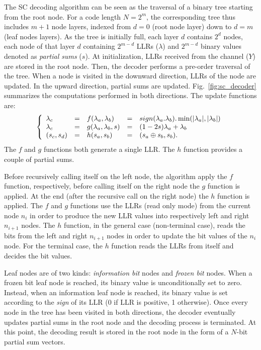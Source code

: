 The SC decoding algorithm can be seen as the traversal of a binary tree starting
from the root node. For a code length $N=2^m$, the corresponding tree thus
includes $m + 1$ node layers, indexed from $d=0$ (root node layer) down to
$d=m$ (leaf nodes layers). As the tree is initially full, each layer $d$
contains $2^d$ nodes, each node of that layer $d$  containing $2^{m-d}$ LLRs
($\lambda$) and $2^{m-d}$ binary values denoted as \textit{partial sums} ($s$).
At initialization, LLRs received  from the channel ($Y$) are stored in the root
node. Then, the decoder performs a pre-order traversal of the tree. When a node
is visited in the downward direction, LLRs of the node are updated. In the
upward direction, partial sums are updated. Fig.~\ref{fig:sc_decoder} summarizes
the computations performed in both directions. The update functions are:
\begin{eqnarray}
\left\{\begin{array}{l c l c l}
\lambda_c &=& f(\lambda_a,\lambda_b) &=& sign(\lambda_a.\lambda_b).\min(|\lambda_a|,|\lambda_b|)\\
\lambda_c &=& g(\lambda_a,\lambda_b,s)&=&(1-2s)\lambda_a+\lambda_b\\
(s_{c}, s_{d}) &=& h(s_{a}, s_{b}) &=& (s_{a} \oplus s_{b}, s_{b}).
\end{array}\right.
\label{eq:f_g}
\end{eqnarray}
The $f$ and $g$ functions both generate a single LLR. The $h$ function provides
a couple of partial sums.

Before recursively calling itself on the left node, the algorithm apply the $f$
function, respectively, before calling itself on the right node the $g$ function
is applied. At the end (after the recursive call on the right node) the $h$
function is applied. The $f$ and $g$ functions use the LLRs (read only mode)
from the current node $n_i$ in order to produce the new LLR values into
respectively left and right $n_{i+1}$ nodes. The $h$ function, in the general
case (non-terminal case), reads the bits from the left and right $n_{i+1}$ nodes
in order to update the bit values of the $n_i$ node. For the terminal case, the
$h$ function reads the LLRs from itself and decides the bit values.

Leaf nodes are of two kinds: \emph{information bit} nodes and \emph{frozen bit}
nodes. When a frozen bit leaf node is reached, its binary value is
unconditionally set to zero. Instead, when an information leaf node is reached,
its binary value is set according to the \emph{sign} of its LLR (0 if LLR is
positive, 1 otherwise). Once every node in the tree has been visited in both
directions, the decoder eventually updates partial sums in the root node and the
decoding process is terminated. At this point, the decoding result is stored in
the root node in the form of a $N$-bit partial sum vectors.

